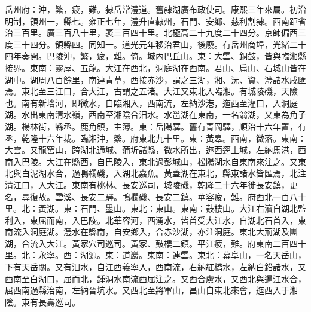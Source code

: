 \begin{pinyinscope}
岳州府：沖，繁，疲，難。隸岳常澧道。舊隸湖廣布政使司。康熙三年來屬。初沿明制，領州一，縣七。雍正七年，澧升直隸州，石門、安鄉、慈利割隸。西南距省治三百里。廣三百八十里，袤三百四十里。北極高二十九度二十四分。京師偏西三度三十四分。領縣四。同知一。道光元年移治君山，後廢。有岳州商埠，光緒二十四年奏開。巴陵沖，繁，疲，難。倚。城內巴丘山。東：大雲、銅鼓，皆與臨湘縣接界。東南：靈屋、五龍。大江在西北，洞庭湖在西南。君山、扁山、石城山皆在湖中。湖周八百餘里，南連青草，西接赤沙，謂之三湖，湘、沅、資、澧諸水咸匯焉。東北至三江口，合大江，古謂之五渚。大江又東北入臨湘。有城陵磯，天險也。南有新墻河，即微水，自臨湘入，西南流，左納沙港，迤西至灌口，入洞庭湖。水出東南清水嶺，西南至湘陰合汨水。水邕湖在東南，一名翁湖，又東為角子湖。楊林街，縣丞。鹿角鎮，主簿。東：岳陽驛。舊有青岡驛，順治十六年置，有丞，乾隆十六年裁。臨湘沖，繁。府東北九十里。東：黃皋。西南，微落。東南：大雲。又龍窖山，跨湖北通城、蒲圻諸縣，微水所出，迤西逕土城，左納馬港，西南入巴陵。大江在縣西，自巴陵入，東北過彭城山，松陽湖水自東南來注之。又東北與白泥湖水合，過鴨欄磯，入湖北嘉魚。黃蓋湖在東北，縣東諸水皆匯焉，北注清江口，入大江。東南有桃林、長安巡司，城陵磯，乾隆二十六年徙長安鎮，更名，尋復故。雲溪、長安二驛。鴨欄磯、長安二鎮。華容疲，難。府西北一百八十里。北：黃湖。東：石門、墨山。東北：東山。東南：鼓樓山。大江右瀆自湖北監利入，東屈而南，入巴陵。北華容河，西湧水，皆首受大江水，自湖北石首入，東南流入洞庭湖。澧水在縣南，自安鄉入，合赤沙湖，亦注洞庭。東北大荊湖及團湖，合流入大江。黃家穴司巡司。黃家、鼓樓二鎮。平江疲，難。府東南二百四十里。北：永寧。西：湖源。東：道巖。東南：連雲。東北：幕阜山，一名天岳山，下有天岳關。又有汨水，自江西義寧入，西南流，右納紅橋水，左納白鉛諸水，又西南至白湖口，屈而北，鍾洞水南流西屈注之。又西合盧水，又西北與暹江水合，屈西南過縣治南，左納晉坑水。又西北至將軍山，昌山自東北來會，迤西入于湘陰。東有長壽巡司。


\end{pinyinscope}
